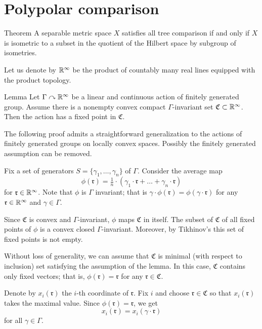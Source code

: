\section{Polypolar comparison}\label{sec:all-tree}


\begin{thm}{Theorem}\label{thm:hilbert-quotient}
A separable metric space $X$ satisfies all tree comparison if and only if
$X$ is isometric to a subset in the quotient of the Hilbert space by subgroup of isometries.
\end{thm}

Let us denote by $\mathbb{R}^\infty$ be the product of countably many real lines equipped with the product topology.

\begin{thm}{Lemma}\label{lem:tikhonov}
Let $\Gamma\curvearrowright \mathbb{R}^\infty$ be a linear and continuous action of finitely generated group.
Assume there is a nonempty convex compact $\Gamma$-invariant set $\mathfrak{C}\subset \mathbb{R}^\infty$.
Then the action has a fixed point in $\mathfrak{C}$.
\end{thm}

The following proof admits a straightforward generalization to the actions of finitely generated groups on locally convex spaces.
Possibly the finitely generated assumption can be removed.

Fix a set of generators $S=\{\gamma_1,\dots,\gamma_n\}$ of $\Gamma$.
Consider the average map
\[\phi(\mathfrak{r})=\tfrac1{n}\cdot(\gamma_1\cdot \mathfrak{r}+\dots+\gamma_n\cdot \mathfrak{r})\]
for $\mathfrak{r}\in\mathbb{R}^\infty$.
Note that $\phi$ is $\Gamma$ invariant;
that is $\gamma\cdot \phi(\mathfrak{r})=\phi(\gamma\cdot\mathfrak{r})$ for any $\mathfrak{r}\in\mathbb{R}^\infty$ and $\gamma\in \Gamma$.

Since $\mathfrak{C}$ is convex and $\Gamma$-invariant, $\phi$ maps $\mathfrak{C}$ in itself.
The subset of $\mathfrak{C}$ of all fixed points of $\phi$ is a convex closed $\Gamma$-invariant.
Moreover, by Tikhinov's this set of fixed points is not empty.

Without loss of generality, we can assume that $\mathfrak{C}$ is minimal (with respect to inclusion) set satisfying the assumption of the lemma.
In this case, $\mathfrak{C}$ contains only fixed vectors;
that is, $\phi(\mathfrak{r})=\mathfrak{r}$ for any $\mathfrak{r}\in \mathfrak{C}$.

Denote by $x_i(\mathfrak{r})$ the $i$-th coordinate of $\mathfrak{r}$.
Fix $i$ and choose $\mathfrak{r}\in \mathfrak{C}$ so that $x_i(\mathfrak{r})$ takes the maximal value.
Since $\phi(\mathfrak{r})=\mathfrak{r}$, we get 
\[x_i(\mathfrak{r})=x_i(\gamma\cdot \mathfrak{r})\]
for all $\gamma\in\Gamma$.

